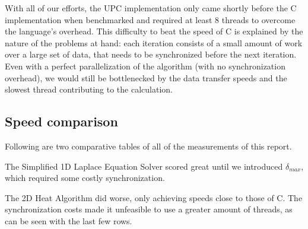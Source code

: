 \documentclass[12pt]{article}
\begin{document}
With all of our efforts, the UPC implementation only came shortly before the C implementation when benchmarked and required at least 8 threads to overcome the language's overhead.
This difficulty to beat the speed of C is explained by the nature of the problems at hand: each iteration consists of a small amount of work over a large set of data, that needs to be synchronized before the next iteration.
Even with a perfect parallelization of the algorithm (with no synchronization overhead), we would still be bottlenecked by the data transfer speeds and the slowest thread contributing to the calculation.

\subsection{Speed comparison}

Following are two comparative tables of all of the measurements of this report.

The Simplified 1D Laplace Equation Solver scored great until we introduced $\delta_{max}$, which required some costly synchronization.

The 2D Heat Algorithm did worse, only achieving speeds close to those of C.
The synchronization costs made it unfeasible to use a greater amount of threads, as can be seen with the last few rows.
\end{document}
